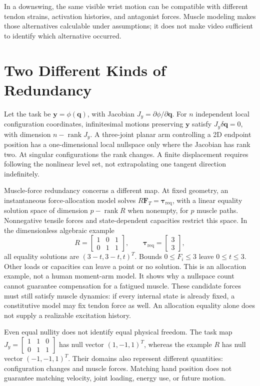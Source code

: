 In a downswing, the same visible wrist motion can be compatible with different
tendon strains, activation histories, and antagonist forces. Muscle modeling
makes those alternatives calculable under assumptions; it does not make video
sufficient to identify which alternative occurred.

\section{Two Different Kinds of Redundancy}

Let the task be $\bm y=\phi(\bm q)$, with
Jacobian $J_y=\partial\phi/\partial\bm q$. For $n$
independent local configuration coordinates, infinitesimal motions preserving
$\bm y$ satisfy $J_y\delta\bm q=0$, with dimension
$n-\operatorname{rank}J_y$. A three-joint planar arm controlling a
2D endpoint position has a one-dimensional local nullspace only where the
Jacobian has rank two. At singular configurations the rank changes. A finite
displacement requires following the nonlinear level set, not extrapolating
one tangent direction indefinitely.

Muscle-force redundancy concerns a different map. At fixed geometry, an
instantaneous force-allocation model solves
$R\bm F_T=\bm\tau_{\mathrm{req}}$, with a linear equality solution space
of dimension $p-\operatorname{rank}R$ when nonempty, for $p$ muscle paths.
Nonnegative tensile forces and state-dependent capacities restrict this space.
In the dimensionless algebraic example
\[
 R=\begin{bmatrix}1&0&1\\0&1&1\end{bmatrix},\qquad
 \bm\tau_{\mathrm{req}}=\begin{bmatrix}3\\3\end{bmatrix},
\]
all equality solutions are $(3-t,3-t,t)^T$. Bounds $0\leq F_i\leq3$
leave $0\leq t\leq3$. Other loads or capacities can leave a point or no
solution. This is an allocation example, not a human moment-arm model. It
shows why a nullspace count cannot guarantee compensation for a fatigued muscle.
These candidate forces must still satisfy muscle dynamics: if every internal
state is already fixed, a constitutive model may fix tendon force as well.
An allocation equality alone does not supply a realizable excitation history.

Even equal nullity does not identify equal physical freedom. The task map
$J_y=\left[\begin{smallmatrix}1&1&0\\0&1&1\end{smallmatrix}\right]$
has null vector $(1,-1,1)^T$, whereas the example $R$ has null vector
$(-1,-1,1)^T$. Their domains also represent different quantities:
configuration changes and muscle forces. Matching hand position does not
guarantee matching velocity, joint loading, energy use, or future motion.

